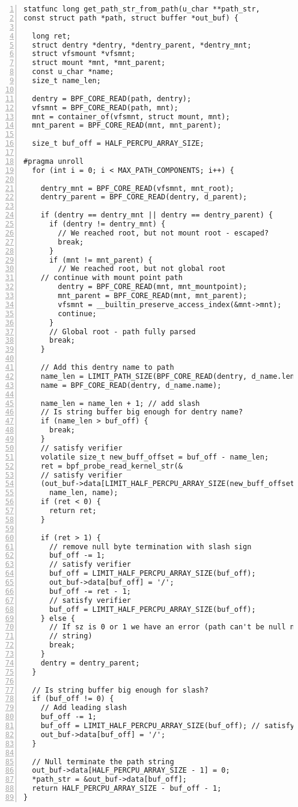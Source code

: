 \begin{lstlisting}[numbers=left]
statfunc long get_path_str_from_path(u_char **path_str, 
const struct path *path, struct buffer *out_buf) {

  long ret;
  struct dentry *dentry, *dentry_parent, *dentry_mnt;
  struct vfsmount *vfsmnt;
  struct mount *mnt, *mnt_parent;
  const u_char *name;
  size_t name_len;

  dentry = BPF_CORE_READ(path, dentry);
  vfsmnt = BPF_CORE_READ(path, mnt);
  mnt = container_of(vfsmnt, struct mount, mnt);
  mnt_parent = BPF_CORE_READ(mnt, mnt_parent);

  size_t buf_off = HALF_PERCPU_ARRAY_SIZE;

#pragma unroll
  for (int i = 0; i < MAX_PATH_COMPONENTS; i++) {

    dentry_mnt = BPF_CORE_READ(vfsmnt, mnt_root);
    dentry_parent = BPF_CORE_READ(dentry, d_parent);

    if (dentry == dentry_mnt || dentry == dentry_parent) {
      if (dentry != dentry_mnt) {
        // We reached root, but not mount root - escaped?
        break;
      }
      if (mnt != mnt_parent) {
        // We reached root, but not global root 
	// continue with mount point path
        dentry = BPF_CORE_READ(mnt, mnt_mountpoint);
        mnt_parent = BPF_CORE_READ(mnt, mnt_parent);
        vfsmnt = __builtin_preserve_access_index(&mnt->mnt);
        continue;
      }
      // Global root - path fully parsed
      break;
    }

    // Add this dentry name to path
    name_len = LIMIT_PATH_SIZE(BPF_CORE_READ(dentry, d_name.len));
    name = BPF_CORE_READ(dentry, d_name.name);

    name_len = name_len + 1; // add slash
    // Is string buffer big enough for dentry name?
    if (name_len > buf_off) {
      break;
    }
    // satisfy verifier
    volatile size_t new_buff_offset = buf_off - name_len;
    ret = bpf_probe_read_kernel_str(&
    // satisfy verifier
    (out_buf->data[LIMIT_HALF_PERCPU_ARRAY_SIZE(new_buff_offset)]), 
      name_len, name);
    if (ret < 0) {
      return ret;
    }

    if (ret > 1) {
      // remove null byte termination with slash sign
      buf_off -= 1;
      // satisfy verifier
      buf_off = LIMIT_HALF_PERCPU_ARRAY_SIZE(buf_off);
      out_buf->data[buf_off] = '/';
      buf_off -= ret - 1;
      // satisfy verifier
      buf_off = LIMIT_HALF_PERCPU_ARRAY_SIZE(buf_off);
    } else {
      // If sz is 0 or 1 we have an error (path can't be null nor an empty
      // string)
      break;
    }
    dentry = dentry_parent;
  }

  // Is string buffer big enough for slash?
  if (buf_off != 0) {
    // Add leading slash
    buf_off -= 1;
    buf_off = LIMIT_HALF_PERCPU_ARRAY_SIZE(buf_off); // satisfy verifier
    out_buf->data[buf_off] = '/';
  }

  // Null terminate the path string
  out_buf->data[HALF_PERCPU_ARRAY_SIZE - 1] = 0;
  *path_str = &out_buf->data[buf_off];
  return HALF_PERCPU_ARRAY_SIZE - buf_off - 1;
}
\end{lstlisting}


